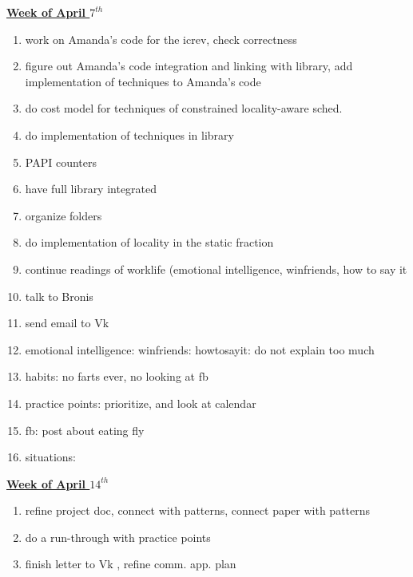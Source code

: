 \underline{\textbf{Week of April $7^{th}$}} \\
\begin{enumerate}
\item work on Amanda's code for the icrev, check correctness
\item figure out Amanda's code integration and linking with library, add implementation of techniques to Amanda's code

\item do cost model for techniques of constrained locality-aware sched. 

\item do implementation of techniques in library

\item PAPI counters
\item have full library integrated
\item organize folders
\item do implementation of locality in the static fraction 

\item continue readings of worklife (emotional intelligence, winfriends, how to say it

\item talk to Bronis

\item send email to Vk

\item emotional intelligence:  winfriends: howtosayit: do not explain too much \\
\item habits: no farts ever, no looking at fb
\item practice points: prioritize, and look at calendar
\item fb:  post about eating fly
\item situations:  \\

\end{enumerate}

\underline{\textbf{Week of April $14^{th}$}} \\
\begin{enumerate}
\item refine project doc, connect with patterns, connect paper with patterns
\item do a run-through with practice points
\item finish letter to Vk , refine comm. app. plan

\end{enumerate}

